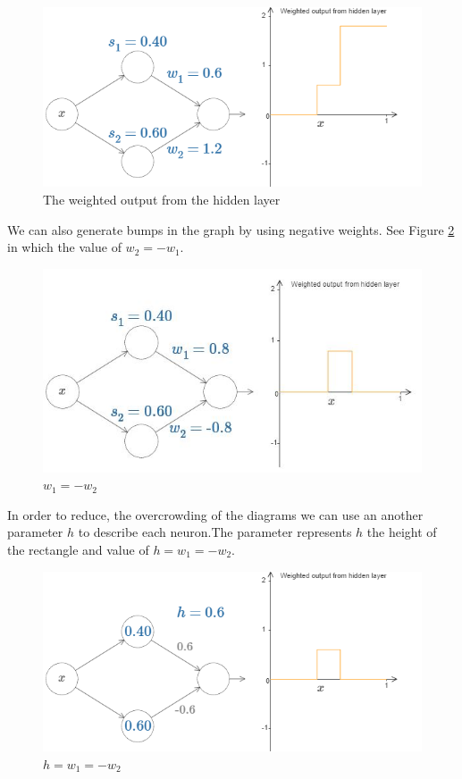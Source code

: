\documentclass{article}
\begin{document}
\begin{figure}[h!]
    \centering
    \includegraphics[width=0.7 \textwidth]{Images/2/5.png}
    \caption{The weighted output from the hidden layer}
    \label{fig:figure6}
\end{figure}
\newpage
 We can also generate bumps in the graph by using negative weights. See Figure \ref{fig:figure7} in which the value of $w_2 = - w_1$.

\begin{figure}[h!]
    \includegraphics[width=0.8 \textwidth]{Images/2/6.png}
    \caption{$w_1 = - w_2$}
    \label{fig:figure7}
\end{figure}

In order to reduce, the overcrowding of the diagrams we can use an another parameter $h$ to describe each neuron.The parameter represents $h$ the height of the rectangle and value of  $ h =  w_1 =  - w_2$.

\begin{figure}[h!]
    \centering
    \includegraphics[width=0.8 \textwidth]{Images/2/10.png}
    \caption{$h = w_1 = -w_2$}
    \label{fig:figure8}
\end{figure}
\end{document}
